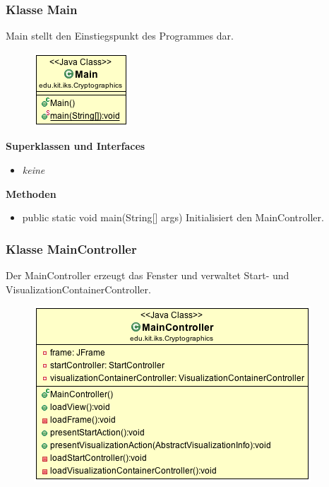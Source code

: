 \documentclass{article}
\begin{document}
    \subsubsection{Klasse Main}
      Main stellt den Einstiegspunkt des Programmes dar.
      \begin{figure}[H]
        \centering
        \includegraphics{resources/edu-kit-iks-Cryptographics-Main}
      \end{figure}

      \textbf{Superklassen und Interfaces}
      \begin{itemize}
        \item \textit{keine}
      \end{itemize}
      
      \textbf{Methoden}
      \begin{itemize}
        \item public static void main(String[] args) \newline
        Initialisiert den MainController.
      \end{itemize}

    \subsubsection{Klasse MainController}
      Der MainController erzeugt das Fenster und verwaltet Start- und VisualizationContainerController.
      \begin{figure}[H]
        \centering
        \includegraphics{resources/edu-kit-iks-Cryptographics-MainController}
      \end{figure}
\end{document}
